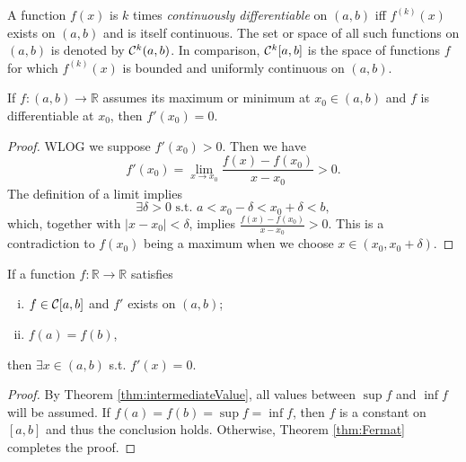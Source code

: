 \begin{defn}
  \label{def:continuouslyDifScalarFunc}
  A function $f(x)$ is
   $k$ times \emph{continuously differentiable}
   on $(a,b)$
   iff $f^{(k)}(x)$ exists on $(a,b)$ and is itself continuous.
  The set or space of all such functions on $(a,b)$
   is denoted by ${\cal C}^k(a,b)$.
  In comparison,
   ${\cal C}^k[a,b]$ is the space of functions $f$
   for which $f^{(k)}(x)$ is bounded and uniformly continuous on $(a,b)$.
\end{defn}

\begin{thm}[Fermat]
  \label{thm:Fermat}
  If $f:(a,b)\rightarrow\mathbb{R}$
   assumes its maximum or minimum at $x_0\in(a,b)$
   and $f$ is differentiable at $x_0$,
   then $f'(x_0)=0$.
\end{thm}
\begin{proof}
  WLOG we suppose $f'(x_0)>0$. Then we have
  \begin{displaymath}
    f'(x_0)=\lim_{x\rightarrow x_0} \frac{f(x)-f(x_0)}{x-x_0}>0.
  \end{displaymath}
  The definition of a limit implies
  \begin{displaymath}
   \exists \delta>0 \text{ s.t. } 
   a<x_0-\delta<x_0+\delta<b,
  \end{displaymath}
   which, together with $|x-x_0|<\delta$, 
   implies
   $\frac{f(x)-f(x_0)}{x-x_0}>0$.
  This is a contradiction to $f(x_0)$ being a maximum
  when we choose $x\in(x_0,x_0+\delta)$.
\end{proof}

\begin{thm}[Rolle's]
  \label{thm:Rolles}
  If a function $f:\mathbb{R}\rightarrow\mathbb{R}$
   satisfies
   \begin{enumerate}[(i)]\itemsep0em
   \item $f\in {\cal C}[a,b]$ and $f'$ exists on $(a,b)$;
   \item $f(a)=f(b)$,
   \end{enumerate}
  then $\exists x\in (a,b)$ s.t. $f'(x)=0$.
\end{thm}
\begin{proof}
  By Theorem \ref{thm:intermediateValue},
   all values between $\sup f$ and $\inf f$
   will be assumed.
  If $f(a)=f(b)=\sup f=\inf f$,
   then $f$ is a constant on $[a,b]$
   and thus the conclusion holds.
  Otherwise, Theorem \ref{thm:Fermat} completes the proof.
\end{proof}

